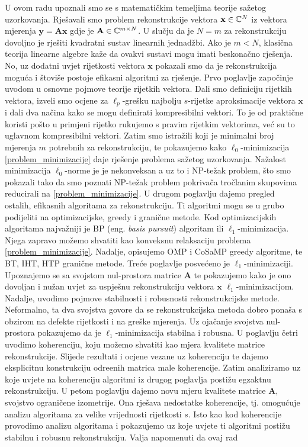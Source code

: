 \documentclass[a4paper,twoside,12pt]{memoir} %
\newcommand{\vect}[1]{\mathbf{#1}}
\renewcommand{\vec}{\vect}
\begin{document}
\begin{sazetak}
    U ovom radu upoznali smo se s matemati\v{c}kim temeljima teorije sa\v{z}etog uzorkovanja. Rje\v{s}avali smo problem rekonstrukcije vektora $\vec x \in \C^N$ iz vektora mjerenja $\vec y = \vec {Ax}$ gdje je $\vec A \in \C^{m \times N}$. U slu\v{c}ju da je $N = m$ za rekonstrukciju dovoljno je rje\v{s}iti kvadratni sustav linearnih jednad\v{z}bi. Ako je $m < N$, klasi\v{c}na teorija linearne algebre ka\v{z}e da ovakvi sustavi mogu imati beskona\v{c}no rje\v{s}enja. No, uz dodatni uvjet rijetkosti vektora $\vec x$ pokazali smo da je rekonstrukcija mogu\'ca i \v{s}tovi\v{s}e postoje efikasni algoritmi za rje\v{s}enje. Prvo poglavlje zapo\v{c}inje uvodom u osnovne pojmove teorije rijetkih vektora. Dali smo definiciju rijetkih vektora, izveli smo ocjene za $\ell_p$-gre\v{s}ku najbolju $s$-rijetke aproksimacije vektora $\vec x$ i dali dva na\v{c}ina kako se mogu definirati kompresibilni vektori. To je od prakti\v{c}ne koristi po\v{s}to u primjeni rijetko rukujemo s pravim rijetkim vektorima, ve\'c su to uglavnom kompresibilni vektori. Zatim smo istra\v{z}ili koji je minimalni broj mjerenja $m$ potrebnih za rekonstrukciju, te pokazujemo kako $\ell_0$-minimizacija \eqref{problem_minimizacije} daje rje\v{s}enje problema sa\v{z}etog uzorkovanja. Na\v{z}alost minimizacija $\ell_0$-norme je je nekonveksan a uz to i NP-te\v{z}ak problem, \v{s}to smo pokazali tako da smo poznati NP-te\v{z}ak problem pokriva\v{c}a tro\v{c}lanim skupovima reducirali na \eqref{problem_minimizacije}. U drugom poglavlju dajemo pregled ostalih, efikasnih algoritama za rekonstrukciju. Ti algoritmi mogu se u grubo podijeliti na optimizacijske, greedy i grani\v{c}ne metode. Kod optimizacijskih algoritama najva\v{z}niji je BP (eng. \textit{basis pursuit}) algoritam ili $\ell_1$-minimizacija. Njega zapravo mo\v{z}emo shvatiti kao konveksnu relaksaciju problema \eqref{problem_minimizacije}. Nadalje, opisujemo OMP i CoSaMP greedy algoritme, te BT, IHT, HTP grani\v{c}ne metode. Tre\'ce poglavlje posve\'ceno je $\ell_1$-minimizaciji. Upoznajemo se sa svojstom nul-prostora matrice $\vec A$ te pokazujemo kako je ono dovoljan i nu\v{z}an uvjet za uspje\v{s}nu rekonstrukciju vektora $\vec x$ $\ell_1$-minimizacijom. Nadalje, uvodimo pojmove stabilnosti i robusnosti rekonstrukcijske metode. Neformalno, ta dva svojstva govore da se rekonstrukcijska metoda dobro pona\v{s}a s obzirom na defekte rijetkosti i na gre\v{s}ke mjerenja. Uz oja\v{c}anje svojstva nul-prostora pokazujemo da je $\ell_1$-minimizacija stabilna i robusna. U poglavlju \v{c}etri uvodimo koherenciju, koju mo\v{z}emo shvatiti kao mjera kvalitete matrice rekonstrukcije. Slijede rezultati i ocjene vezane uz koherenciju te dajemo eksplicitnu konstrukciju odre\dj enih matrica male koherencije. Zatim analiziramo uz koje uvjete na koherenciju algoritmi iz drugog poglavlja posti\v{z}u egzaktnu rekonstrukciju. U petom poglavlju dajemo novu mjeru kvalitete matrice $\vec A$, svojstvo ograni\v{c}ene izometrije. Ona rje\v{s}ava nedostatke koherencije, tj. omogu\'cuje analizu algoritama za velike vrijednosti rijetkosti $s$. Isto kao kod koherencije provodimo analizu algoritama i pokazujemo uz koje uvjete ti algoritmi posti\v{z}u stabilnu i robusnu rekonstrukciju. Valja napomenuti da ovaj rad 
\end{sazetak}
\end{document}
